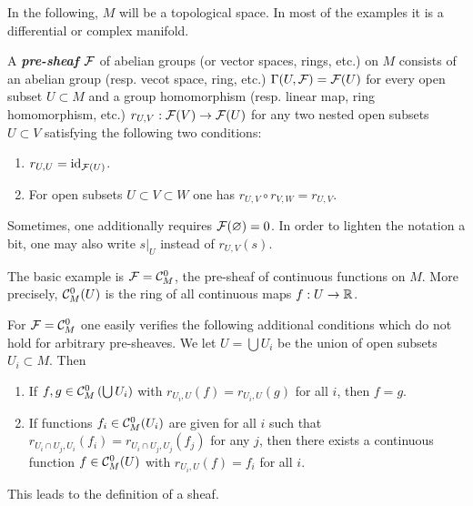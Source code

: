 In the following, $M$ will be a topological space. In most of the examples it is a differential or complex manifold.
\begin{defn}
	A \textbf{\textit{pre-sheaf $\mathcal{F}$}} of abelian groups (or vector spaces, rings, etc.) on $M$ consists of an abelian group (resp. vecot space, ring, etc.) $\Gamma(U,\mathcal{F})=\mathcal{F}(U)$ for every open subset $U\subset M$ and a group homomorphism (resp. linear map, ring homomorphism, etc.) $r_{U,V}:\mathcal{F}(V)\to \mathcal{F}(U)$ for any two nested open subsets $U\subset V$ satisfying the following two conditions:
	\begin{enumerate}
		\item[$(i)$] $r_{U,U}=\operatorname{id}_{\mathcal{F}(U)}$.
		\item[$(ii)$] For open subsets $U\subset V\subset W$ one has $r_{U,V}\circ r_{V,W}=r_{U,V}$.
	\end{enumerate}
	Sometimes, one additionally requires $\mathcal{F}(\varnothing)=0$. In order to lighten the notation a bit, one may also write $s|_U$ instead of $r_{U,V}(s)$.
\end{defn}
\begin{example}
	The basic example is $\mathcal{F}=\mathcal{C}_M^0$, the pre-sheaf of continuous functions on $M$. More precisely, $\mathcal{C}_M^0(U)$ is the ring of all continuous maps $f:U\to\mathbb{R}$.
\end{example}
For $\mathcal{F}=\mathcal{C}_M^0$ one easily verifies the following additional conditions which do not hold for arbitrary pre-sheaves. We let $U=\bigcup U_i$ be the union of open subsets $U_i\subset M$. Then 
\begin{enumerate}
	\item[$(iii)$] If $f,g\in\mathcal{C}^0_M\left(\bigcup U_i\right)$ with $r_{U_i,U}(f)=r_{U_i,U}(g)$ for all $i$, then $f=g$.
	\item[$(iv)$] If functions $f_i\in\mathcal{C}_M^0(U_i)$ are given for all $i$ such that $r_{U_i\cap U_j,U_i}(f_i)=r_{U_i\cap U_j,U_j}(f_j)$ for any $j$, then there exists a continuous function $f\in\mathcal{C}^0_M(U)$ with $r_{U_i,U}(f)=f_i$ for all $i$.
\end{enumerate}
This leads to the definition of a sheaf.

